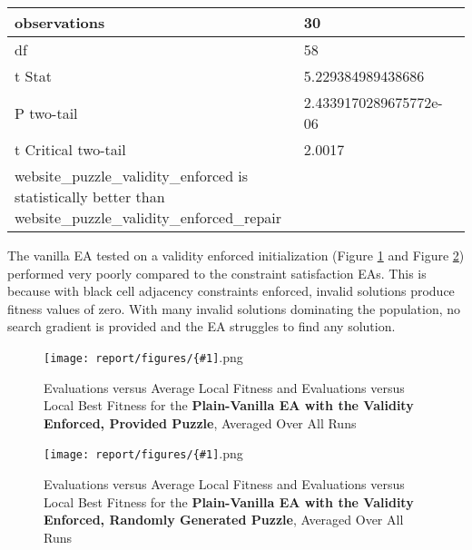 \documentclass[11pt]{article}
\newcommand{\fitnessplotcaption}[1]{\caption{Evaluations versus Average Local Fitness and Evaluations versus 
    Local Best Fitness for the \textbf{{#1}}, Averaged Over All Runs}}
\newcommand{\addgraphic}[1]{\centerline{\texttt{[image: report/figures/\{\#1]}.png}}}
\begin{document}
\begin{table}[H]
{\begin{tabular}{|l|l|l|}
    observations                                                                                                & 30                                  &                                            \\ \hline
    df                                                                                                          & 58                                  &                                            \\ \hline
    t Stat                                                                                                      & 5.229384989438686                   &                                            \\ \hline
    P two-tail                                                                                                  & 2.4339170289675772e-06              &                                            \\ \hline
    t Critical two-tail                                                                                         & 2.0017                              &                                            \\ \hline
    website\_puzzle\_validity\_enforced is statistically better than website\_puzzle\_validity\_enforced\_repair &                                     &                                            \\ \hline
    \end{tabular}%
    }
\end{table}


The vanilla EA tested on a validity enforced initialization (Figure \ref{fig:website_puzzle_validity_enforced_vanilla_graph} 
and Figure \ref{fig:random_gen_validity_enforced_vanilla_graph}) performed very poorly compared to the constraint satisfaction EAs.
This is because with black cell adjacency constraints enforced, invalid solutions produce fitness values of zero. With many invalid solutions
dominating the population, no search gradient is provided and the EA struggles to find any solution.

\begin{figure}[H]
    \addgraphic{website_puzzle_validity_enforced_vanilla_graph}
    \fitnessplotcaption{Plain-Vanilla EA with the Validity Enforced, Provided Puzzle}
    \label{fig:website_puzzle_validity_enforced_vanilla_graph}
\end{figure}

\begin{figure}[H]
    \addgraphic{random_gen_validity_enforced_vanilla_graph}
    \fitnessplotcaption{Plain-Vanilla EA with the Validity Enforced, Randomly Generated Puzzle}
    \label{fig:random_gen_validity_enforced_vanilla_graph}
\end{figure}
\end{document}
